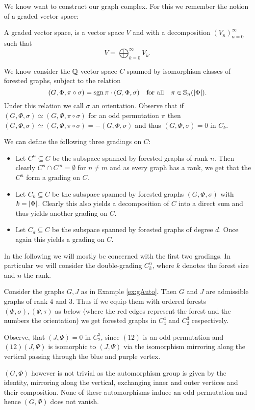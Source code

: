 We know want to construct our graph complex. For this we remember the notion of a graded vector space:
\begin{definition}
	A graded vector space, is a vector space $V$ and with a decomposition $\left(V_{n}\right)^{\infty}_{n=0} $ such that
	\[
		V = \bigoplus_{k=0}^{\infty} V_{k}
	.\] 
\end{definition}

We know consider the $\mathbb{Q}$-vector space $C$ spanned by isomorphism classes of forested graphs, subject to the relation
\[
	(G,\Phi, \pi \circ \sigma) = \sgn{\pi} \cdot (G,\Phi, \sigma) \qq{for all} \pi \in \mathbb{S}_{n}(\abs{\Phi})
.\]
Under this relation we call $\sigma$ an orientation.
Observe that if $(G,\Phi, \sigma) \simeq (G,\Phi, \pi \circ \sigma)$ for an odd permutation $\pi$ then 
$(G,\Phi, \sigma) \simeq (G,\Phi, \pi \circ \sigma) = - (G,\Phi, \sigma)$ and thus $(G,\Phi, \sigma) = 0$ in  $C_{k}$.

We can define the following three gradings on $C$:
 \begin{itemize}
	\item Let $C^{n} \subseteq C$ be the subspace spanned by forested graphs of rank $n$. Then clearly  $C^{n} \cap C^{m} = \emptyset$ for $n \neq m$ and
		as every graph has a rank, we get that the $C^{n}$ form a grading on $C$.
	\item Let $C_{k} \subseteq C$ be the subspace spanned by forested graphs $(G,\Phi,\sigma)$ with $k = \abs{\Phi}$. Clearly this also yields a decomposition of $C$ into a direct sum
		and thus yields another grading on $C$.
	\item Let  $C_{d} \subseteq C$ be the subspace spanned by forested graphs of degree $d$. Once again this yields a grading on $C$.
\end{itemize}
In the following we will mostly be concerned with the first two gradings. In particular we will consider the double-grading $C_{k}^{n}$,
where $k$ denotes the forest size and $n$ the rank. 

\begin{eg}
	Consider the graphs $G, J$ as in Example \ref{ex:gAuto}. Then $G$ and $J$ are admissible graphs of rank $4$ and $3$. Thus if we equip them with ordered forests 
	$(\Phi,\sigma), (\Psi,\tau)$ as below 
	(where the red edges represent the forest and the numbers the orientation) we get forested graphs in $C^{4}_{4}$ and $C^{3}_{2}$ respectively.


	Observe, that $(J,\Psi) = 0$ in $C_{2}^{3}$, since $ (1 2)$ is an odd permutation and  $(1 2) (J,\Psi)$ is isomorphic to $(J,\Psi)$ 
	via the isomorphism mirroring along the vertical passing through the blue and purple vertex.

	$(G,\Phi)$ however is not trivial as the automorphism group is given by the identity,
	mirroring along the vertical, exchanging inner and outer vertices and their composition.
	None of these automorphisms induce an odd permutation and hence $(G,\Phi)$ does not vanish.
\end{eg}

